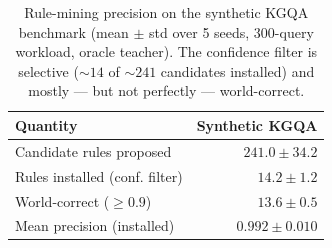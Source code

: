 \documentclass[11pt]{article}
\theoremstyle{plain}
\newcommand{\ruleSeeds}{5}
\renewcommand{\ruleSeeds}{5}
\begin{document}
\begin{table}[t]
\centering
\caption{Rule-mining precision on the synthetic KGQA benchmark (mean $\pm$ std
over \ruleSeeds{} seeds, $300$-query workload, oracle teacher). The confidence
filter is selective (${\sim}14$ of ${\sim}241$ candidates installed) and mostly
--- but not perfectly --- world-correct.}
\label{tab:rule_precision}
\begin{tabular}{lr}
\toprule
Quantity & Synthetic KGQA \\
\midrule
Candidate rules proposed & $241.0 \pm 34.2$ \\
Rules installed (conf. filter) & $14.2 \pm 1.2$ \\
World-correct ($\ge 0.9$) & $13.6 \pm 0.5$ \\
Mean precision (installed) & $0.992 \pm 0.010$ \\
\bottomrule
\end{tabular}

\end{table}
\end{document}
